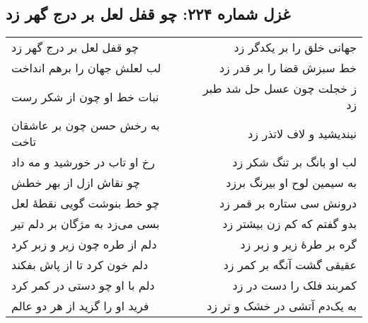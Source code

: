 \begin{center}
\section*{غزل شماره ۲۲۴: چو قفل لعل بر درج گهر زد}
\label{sec:224}
\begin{longtable}{l p{0.5cm} r}
چو قفل لعل بر درج گهر زد
&&
جهانی خلق را بر یکدگر زد
\\
لب لعلش جهان را برهم انداخت
&&
خط سبزش قضا را بر قدر زد
\\
نبات خط او چون از شکر رست
&&
ز خجلت چون عسل حل شد طبر زد
\\
به رخش حسن چون بر عاشقان تاخت
&&
نیندیشید و لاف لاتذر زد
\\
رخ او تاب در خورشید و مه داد
&&
لب او بانگ بر تنگ شکر زد
\\
چو نقاش ازل از بهر خطش
&&
به سیمین لوح او بیرنگ برزد
\\
چو خط بنوشت گویی نقطهٔ لعل
&&
درونش سی ستاره بر قمر زد
\\
بسی می‌زد به مژگان بر دلم تیر
&&
بدو گفتم که کم زن بیشتر زد
\\
دلم از طره چون زیر و زبر کرد
&&
گره بر طرهٔ زیر و زبر زد
\\
دلم خون کرد تا از پاش بفکند
&&
عقیقی گشت آنگه بر کمر زد
\\
دلم با او چو دستی در کمر کرد
&&
کمربند فلک را دست در زد
\\
فرید او را گزید از هر دو عالم
&&
به یک‌دم آتشی در خشک و تر زد
\\
\end{longtable}
\end{center}
